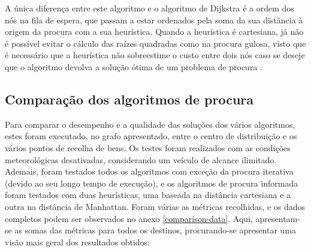 \documentclass[12pt, a4paper]{article}
\begin{document}
A única diferença entre este algoritmo e o algoritmo de Dijkstra é a ordem dos nós na fila de
espera, que passam a estar ordenados pela soma da sua distância à origem da procura com a sua
heurística. Quando a heurística é cartesiana, já não é possível evitar o cálculo das raízes
quadradas como na procura gulosa, visto que é necessário que a heurística não sobreestime o custo
entre dois nós caso se deseje que o algoritmo devolva a solução ótima de um problema de procura
\cite{aima}.

\subsection{Comparação dos algoritmos de procura}

Para comparar o desempenho e a qualidade das soluções dos vários algoritmos, estes foram executado,
no grafo apresentado, entre o centro de distribuição e os vários pontos de recolha de bens. Os
testes foram realizados com as condições meteorológicas desativadas, considerando um veículo de
alcance ilimitado. Ademais, foram testados todos os algoritmos com exceção da procura iterativa
(devido ao seu longo tempo de execução), e os algoritmos de procura informada foram testados com
duas heurísticas, uma baseada na distância cartesiana e a outra na distância de Manhattan. Foram
várias as métricas recolhidas, e os dados completos podem ser observados no anexo
\ref{comparison-data}. Aqui, apresentam-se as somas das métricas para todos os destinos,
procurando-se apresentar uma visão mais geral dos resultados obtidos:
\end{document}
